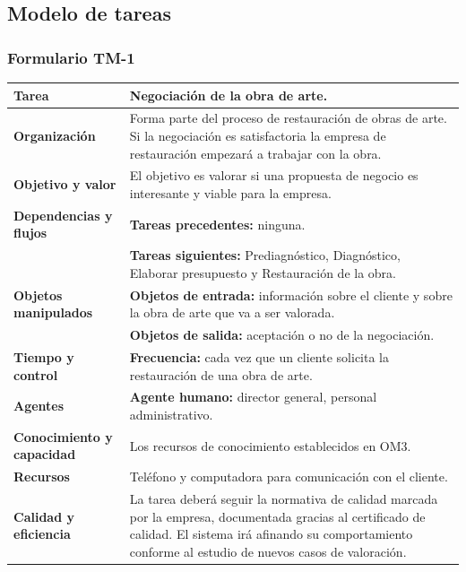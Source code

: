 \documentclass[a4paper,11pt]{article}
\begin{document}
		\subsection{Modelo de tareas}
			\subsubsection{Formulario TM-1}
			\begin{center}
				\begin{tabular}{| l | p{6.5cm} |}
					\hline
					\cellcolor[RGB]{224,233,250}\textbf{Tarea} & Negociación de la obra de
					arte.\\
					\hline
					\cellcolor[RGB]{224,233,250}\textbf{Organización} & Forma parte del proceso
					de restauración de obras de arte. Si la negociación es satisfactoria la empresa de restauración empezará a trabajar con la obra.\\
					\hline
					\cellcolor[RGB]{224,233,250}\textbf{Objetivo y valor} & El objetivo es
					valorar si una propuesta de negocio es interesante y viable para la empresa.\\
					\hline
					\cellcolor[RGB]{224,233,250}\textbf{Dependencias y flujos} & \textbf{Tareas
					precedentes:} ninguna.\\
					\cellcolor[RGB]{224,233,250}& \textbf{Tareas siguientes:} Prediagnóstico,
					Diagnóstico, Elaborar presupuesto y Restauración de la obra.\\
					\hline
					\cellcolor[RGB]{224,233,250}\textbf{Objetos manipulados} & \textbf{Objetos
					de entrada:} información sobre el cliente y sobre la obra de arte que va a ser valorada.\\
					\cellcolor[RGB]{224,233,250}& \textbf{Objetos de salida:} aceptación o no
					de la negociación.\\
					\hline
					\cellcolor[RGB]{224,233,250}\textbf{Tiempo y control} &
					\textbf{Frecuencia:} cada vez que un cliente solicita la restauración de una obra de arte.\\
					\hline
					\cellcolor[RGB]{224,233,250}\textbf{Agentes} & \textbf{Agente humano:}
					director general, personal administrativo.\\
					\hline
					\cellcolor[RGB]{224,233,250}\textbf{Conocimiento y capacidad} & Los
					recursos de conocimiento establecidos en OM3.\\
					\hline
					\cellcolor[RGB]{224,233,250}\textbf{Recursos} & Teléfono y computadora para
					comunicación con el cliente.\\
					\hline
					\cellcolor[RGB]{224,233,250}\textbf{Calidad y eficiencia} & La tarea deberá
					seguir la normativa de calidad marcada por la empresa, documentada gracias al certificado de
					calidad. El sistema irá afinando su comportamiento conforme al estudio de
					nuevos casos de valoración.\\
					\hline
				\end{tabular}
			\end{center}
\end{document}
